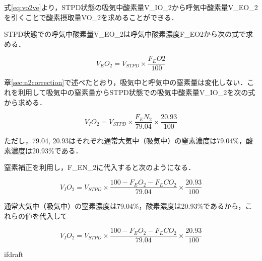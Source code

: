 式\ref{eq:vo2ve}より，STPD状態の吸気中酸素量V_IO_2から呼気中酸素量V_EO_2を引くことで酸素摂取量VO_2を求めることができる．

STPD状態での呼気中酸素量V_EO_2は呼気中酸素濃度F_EO2から次の式で求める．

\begin{equation}
  V_EO_2 = V_{STPD} \times \frac{F_EO2}{100}
\end{equation}

章\ref{sec:n2correction}で述べたとおり，吸気中と呼気中の窒素量は変化しない．これを利用して吸気中の窒素量からSTPD状態での吸気中酸素量V_IO_2を次の式から求める．

\begin{equation}
  V_IO_2 = V_{STPD} \times \frac{F_EN_2}{79.04} \times \frac{20.93}{100}
\end{equation}

ただし，79.04, 20.93はそれぞれ通常大気中（吸気中）の窒素濃度は79.04\%，酸素濃度は20.93\%である．

窒素補正を利用し，F_EN_2に代入すると次のようになる．

\begin{equation}
  V_IO_2 = V_{STPD} \times \frac{100 - F_EO_2 - F_ECO_2}{79.04} \times \frac{20.93}{100}
\end{equation}

通常大気中（吸気中）の窒素濃度は79.04\%，酸素濃度は20.93\%であるから，これらの値を代入して

\begin{equation}
  V_IO_2 = V_{STPD} \times \frac{100 - F_EO_2 - F_ECO_2}{79.04} \times \frac{20.93}{100}
\end{equation}

\expandafter\ifx\csname ifdraft\endcsname\relax
  
\fi

